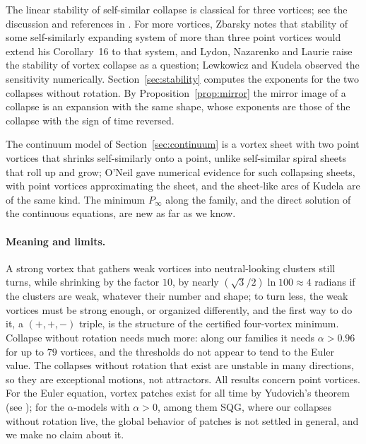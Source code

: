 \documentclass[11pt]{article}
\theoremstyle{definition}
\begin{document}
The linear stability of self-similar collapse is classical for three vortices; see the discussion and references in \cite[Sect.~9]{mw2026}. For more vortices, Zbarsky \cite[p.~20]{zbarsky2024} notes that stability of some self-similarly expanding system of more than three point vortices would extend his Corollary~16 to that system, and Lydon, Nazarenko and Laurie \cite[p.~39]{lnl2022} raise the stability of vortex collapse as a question; Lewkowicz and Kudela \cite{lk2015} observed the sensitivity numerically. Section~\ref{sec:stability} computes the exponents for the two collapses without rotation. By Proposition~\ref{prop:mirror} the mirror image of a collapse is an expansion with the same shape, whose exponents are those of the collapse with the sign of time reversed.

The continuum model of Section~\ref{sec:continuum} is a vortex sheet with two point vortices that shrinks self-similarly onto a point, unlike self-similar spiral sheets that roll up and grow; O'Neil \cite{oneil2010} gave numerical evidence for such collapsing sheets, with point vortices approximating the sheet, and the sheet-like arcs of Kudela \cite{kudela2021} are of the same kind. The minimum $P_\infty$ along the family, and the direct solution of the continuous equations, are new as far as we know.

\paragraph{Meaning and limits.} A strong vortex that gathers weak vortices into neutral-looking clusters still turns, while shrinking by the factor $10$, by nearly $(\sqrt{3}/2)\ln 100 \approx 4$ radians if the clusters are weak, whatever their number and shape; to turn less, the weak vortices must be strong enough, or organized differently, and the first way to do it, a $(+,+,-)$ triple, is the structure of the certified four-vortex minimum. Collapse without rotation needs much more: along our families it needs $\alpha > 0.96$ for up to $79$ vortices, and the thresholds do not appear to tend to the Euler value. The collapses without rotation that exist are unstable in many directions, so they are exceptional motions, not attractors. All results concern point vortices. For the Euler equation, vortex patches exist for all time by Yudovich's theorem (see \cite[Sect.~9]{mw2026}); for the $\alpha$-models with $\alpha > 0$, among them SQG, where our collapses without rotation live, the global behavior of patches is not settled in general, and we make no claim about it.
\end{document}

